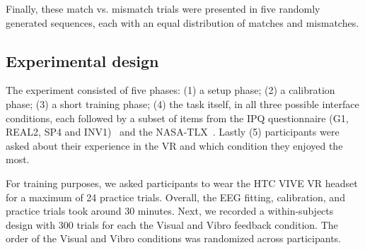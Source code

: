 Finally, these match vs. mismatch trials were presented in five randomly generated sequences, each with an equal distribution of matches and mismatches.

\subsection{Experimental design}
The experiment consisted of five phases: (1) a setup phase; (2) a calibration phase; (3) a short training phase; (4) the task itself, in all three possible interface conditions, each followed by a subset of items from the IPQ questionnaire (G1, REAL2, SP4 and INV1)~\cite{Schubert2003-sq} and the NASA-TLX~\cite{Hart1988-iw}. Lastly (5) participants were asked about their experience in the VR and which condition they enjoyed the most.

For training purposes, we asked participants to wear the HTC VIVE VR headset for a maximum of 24 practice trials. Overall, the EEG fitting, calibration, and practice trials took around 30 minutes. Next, we recorded a within-subjects design with 300 trials for each the Visual and Vibro feedback condition. The order of the Visual and Vibro conditions was randomized across participants.




